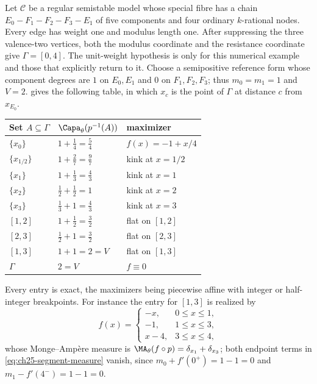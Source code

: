 \begin{example}
\label{ex:ch25-segment-capacities}
Let \(\mathcal C\) be a regular semistable model whose special fibre has a
chain \(E_0-F_1-F_2-F_3-E_1\) of five components and four ordinary
\(k\)-rational nodes.  Every edge has weight one and modulus length
one.  After suppressing the three valence-two vertices, both the
modulus coordinate and the resistance coordinate give
\(\Gamma=[0,4]\).  The unit-weight hypothesis is only for this
numerical example and those that explicitly return to it.  Choose a semipositive reference form whose component
degrees are \(1\) on \(E_0,E_1\) and \(0\) on \(F_1,F_2,F_3\); thus
\(m_0=m_1=1\) and \(V=2\).  
gives the following table, in which \(x_c\) is the point of \(\Gamma\) at
distance \(c\) from \(x_{E_0}\).

\begin{center}
\small
\begin{tabular}{l|l|l}
\toprule
\textbf{Set }\(A\subseteq\Gamma\)&\(\Capa_\theta(p^{-1}(A))\)
 &\textbf{maximizer}\\
\midrule
\(\{x_0\}\)&\(1+\tfrac14=\tfrac54\)&\(f(x)=-1+x/4\)\\
\(\{x_{1/2}\}\)&\(1+\tfrac27=\tfrac97\)&kink at \(x=1/2\)\\
\(\{x_1\}\)&\(1+\tfrac13=\tfrac43\)&kink at \(x=1\)\\
\(\{x_2\}\)&\(\tfrac12+\tfrac12=1\)&kink at \(x=2\)\\
\(\{x_3\}\)&\(\tfrac13+1=\tfrac43\)&kink at \(x=3\)\\
\([1,2]\)&\(1+\tfrac12=\tfrac32\)&flat on \([1,2]\)\\
\([2,3]\)&\(\tfrac12+1=\tfrac32\)&flat on \([2,3]\)\\
\([1,3]\)&\(1+1=2=V\)&flat on \([1,3]\)\\
\(\Gamma\)&\(2=V\)&\(f\equiv0\)\\
\bottomrule
\end{tabular}
\end{center}

Every entry is exact, the maximizers being piecewise affine with integer or
half-integer breakpoints.  For instance the entry for \([1,3]\) is realized
by
\[
 f(x)=\begin{cases}-x,&0\leq x\leq1,\\ -1,&1\leq x\leq3,\\
  x-4,&3\leq x\leq4,\end{cases}
\]
whose Monge--Amp\`ere measure is
\(\MA_\theta(f\circ p)=\delta_{x_1}+\delta_{x_3}\); both endpoint terms in
\eqref{eq:ch25-segment-measure} vanish, since
\(m_0+f'(0^+)=1-1=0\) and \(m_1-f'(4^-)=1-1=0\).


\end{example}
